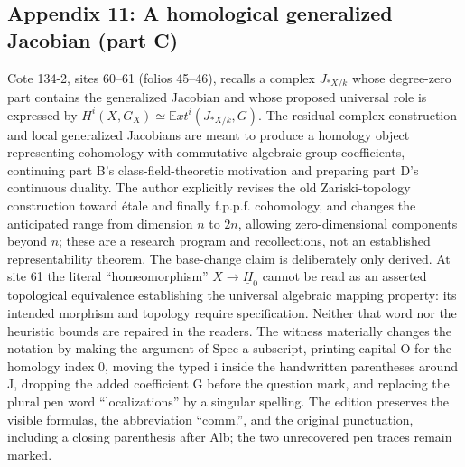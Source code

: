\subsection*{Appendix 11: A homological generalized Jacobian (part C)}
Cote 134-2, sites 60--61 (folios 45--46), recalls a complex $J_{*X/k}$ whose degree-zero part contains the generalized Jacobian and whose proposed universal role is expressed by $H^i(X,G_X)\simeq\mathbb E xt^i(J_{*X/k},G)$. The residual-complex construction and local generalized Jacobians are meant to produce a homology object representing cohomology with commutative algebraic-group coefficients, continuing part B's class-field-theoretic motivation and preparing part D's continuous duality. The author explicitly revises the old Zariski-topology construction toward étale and finally f.p.p.f. cohomology, and changes the anticipated range from dimension $n$ to $2n$, allowing zero-dimensional components beyond $n$; these are a research program and recollections, not an established representability theorem. The base-change claim is deliberately only derived. At site 61 the literal ``homeomorphism'' $X\to\underline H_0$ cannot be read as an asserted topological equivalence establishing the universal algebraic mapping property: its intended morphism and topology require specification. Neither that word nor the heuristic bounds are repaired in the readers. The witness materially changes the notation by making the argument of Spec a subscript, printing capital O for the homology index 0, moving the typed i inside the handwritten parentheses around J, dropping the added coefficient G before the question mark, and replacing the plural pen word ``localizations'' by a singular spelling. The edition preserves the visible formulas, the abbreviation ``comm.'', and the original punctuation, including a closing parenthesis after Alb; the two unrecovered pen traces remain marked.


